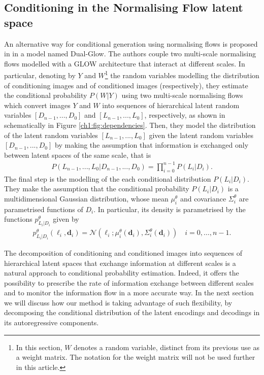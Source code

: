 \subsection{Conditioning in the Normalising Flow latent space}
An alternative way for conditional generation using normalising flows is proposed in \cite{Dual-Glow} in a model named Dual-Glow. The authors couple two multi-scale normalising flows modelled with a GLOW architecture that interact at different scales. %
In particular, denoting by $Y$ and $W$\footnote{In this section, $W$ denotes a random variable, distinct from its previous use as a weight matrix. The notation for the weight matrix will not be used further in this article.} the random variables modelling the distribution of conditioning images and of conditioned images (respectively), they estimate the conditional probability $P(W|Y)$ using two multi-scale normalising flows which convert images $Y$ and $W$ into sequences of hierarchical latent random variables $[D_{n-1}, ..., D_0]$ and $ [L_{n-1}, ..., L_0]$, respectively, as shown in schematically in Figure \ref{ch1:fig:dependencies}. 
Then, they model the distribution of the latent random variables $ [L_{n-1}, ..., L_0]$ given the latent random variables $[D_{n-1}, ..., D_0]$ by making the assumption that information is exchanged only between latent spaces of the same scale, that is \begin{align}\label{ch1:eq:Dual-Glowdep}
P(L_{n-1}, ..., L_0|D_{n-1}, ..., D_0)  = \prod_{i=0}^{n-1}P(L_{i}|D_{i}).
\end{align}
The final step is the modelling of the each conditional distribution  $P(L_{i}|D_{i})$. They make the assumption that the conditional probability $P(L_{i}|D_{i})$ is a multidimensional Gaussian distribution, whose mean $\mu_i^{\theta}$ and covariance $\Sigma_i^{\theta}$ are parametrised functions of $D_{i}$. In particular, its density is parametrised by the functions $p_{L_{i}|D_{i}}^\theta$ given by
\begin{align}\label{ch1:eq:Dual-Glowdep}
p^\theta_{L_{i}|D_{i}}(\boldsymbol{\ell}_i, \boldsymbol{d}_i)  = \mathcal{N}(\boldsymbol{\ell}_i; \mu_i^{\theta}(\boldsymbol{d}_{i}), \Sigma_i^{\theta}(\boldsymbol{d}_i)) \quad i = 0,\ldots, n-1.
\end{align}


The decomposition of conditioning and conditioned images into sequences of hierarchical latent spaces that exchange information at different scales is a natural approach to conditional probability estimation. Indeed, it offers the possibility to prescribe the rate of information exchange between different scales and to monitor the information flow in a more accurate way. In the next section we will discuss how our method is taking advantage of such flexibility, by decomposing the conditional distribution of the latent encodings and decodings in its autoregressive components.

